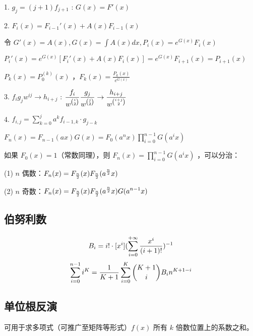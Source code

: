 1. $g_j=(j+1)f_{j+1}$ : $G(x)=F'(x)$

\vspace{0.3cm}

2. $F_i(x)=F_{i-1}'(x)+A(x)F_{i-1}(x)$ 

\setlength{\parindent}{12pt}
   
   令 $\displaystyle G'(x)=A(x),G(x)=\int A(x)dx,P_i(x)=e^{G(x)}F_i(x)$
   
   $\displaystyle P_i'(x)=e^{G(x)}[F_i'(x)+A(x)F_i(x)]=e^{G(x)}F_{i+1}(x)=P_{i+1}(x)$
   
   $P_k(x)=P_0^{(k)}(x)$ ，$\displaystyle F_k(x)=\frac{P_k(x)}{e^{G(x)}}$


\setlength{\parindent}{0pt}

\vspace{0.3cm}


3. $f_ig_jw^{ij}\to h_{i+j}$ : $\displaystyle{f_{i}\over w^{i\choose 2}}{g_j\over w^{j\choose 2}}\to{h_{i+j}\over w^{i+j\choose 2}}$


\vspace{0.1cm}


4. $\displaystyle f_{i,j}=\sum_{k=0}^{j}a^kf_{i-1,k}\cdot g_{j-k}$

\setlength{\parindent}{12pt}

   $F_n(x)=F_{n-1}(ax)G(x)=F_0(a^nx)\prod_{i=0}^{n-1}G(a^ix)$
   
   如果 $F_0(x)=1$（常数同理），则 $F_n(x)=\prod_{i=0}^{n-1}G(a^ix)$ ，可以分治：
   
   (1) $n$ 偶数：$\displaystyle F_n(x)=F_{n\over2}(x)F_{n\over2}(a^{n\over2}x)$
   
   (2) $n$ 奇数：$\displaystyle F_n(x)=F_{n\over 2}(x)F_{n\over2}(a^{n\over2}x)G(a^{n-1}x)$

\setlength{\parindent}{0pt}


\subsection{伯努利数}

$$
B_i=i!\cdot [x^i](\sum_{i=0}^{+\infty}{x^i\over(i+1)!})^{-1}
$$
$$
\sum_{i=0}^{n-1}i^K={1\over K+1}\sum_{i=0}^{K}{K+1\choose i}B_in^{K+1-i}
$$

\subsection{单位根反演}

可用于求多项式（可推广至矩阵等形式）$f(x)$ 所有 $k$ 倍数位置上的系数之和。

